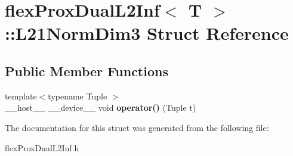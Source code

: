 \hypertarget{structflex_prox_dual_l2_inf_1_1_l21_norm_dim3}{}\section{flex\+Prox\+Dual\+L2\+Inf$<$ T $>$\+:\+:L21\+Norm\+Dim3 Struct Reference}
\label{structflex_prox_dual_l2_inf_1_1_l21_norm_dim3}
\subsection*{Public Member Functions}
\begin{DoxyCompactItemize}
\item 
\mbox{\label{structflex_prox_dual_l2_inf_1_1_l21_norm_dim3_a82a8815b5e7798682f93400386b29f06}} 
{\footnotesize template$<$typename Tuple $>$ }\\\+\_\+\+\_\+host\+\_\+\+\_\+ \+\_\+\+\_\+device\+\_\+\+\_\+ void {\bfseries operator()} (Tuple t)
\end{DoxyCompactItemize}


The documentation for this struct was generated from the following file\+:\begin{DoxyCompactItemize}
\item 
flex\+Prox\+Dual\+L2\+Inf.\+h\end{DoxyCompactItemize}
